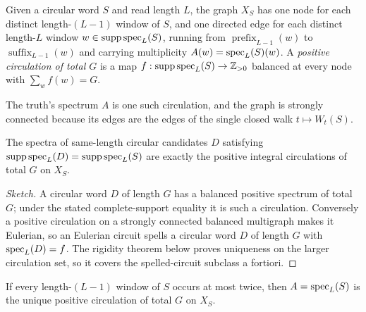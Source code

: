 \begin{definition}
\label{def:graph}
Given a circular word $S$ and read length $L$, the graph $X_S$ has one node for
each distinct length-$(L-1)$ window of $S$, and one directed edge for each
distinct length-$L$ window $w\in\operatorname{supp}\operatorname{spec}_L(S)$, running from
$\operatorname{prefix}_{L-1}(w)$ to $\operatorname{suffix}_{L-1}(w)$ and carrying
multiplicity $A(w)=\operatorname{spec}_L(S)(w)$. A \emph{positive circulation of total $G$} is
a map $f:\operatorname{supp}\operatorname{spec}_L(S)\to\mathbb{Z}_{>0}$ balanced at every node with
$\sum_w f(w)=G$.
\end{definition}

The truth's spectrum $A$ is one such circulation, and the graph is strongly
connected because its edges are the edges of the single closed walk
$t\mapsto W_t(S)$.

\begin{lemma}
\label{lem:reduction}
The spectra of same-length circular candidates $D$ satisfying
$\operatorname{supp}\operatorname{spec}_L(D)=\operatorname{supp}\operatorname{spec}_L(S)$ are exactly
the positive integral circulations of total $G$ on $X_S$.
\end{lemma}

\begin{proof}[Sketch]
A circular word $D$ of length $G$ has a balanced positive spectrum of total $G$;
under the stated complete-support equality it is such a circulation. Conversely a positive
circulation on a strongly connected balanced multigraph makes it Eulerian, so an
Eulerian circuit spells a circular word $D$ of length $G$ with
$\operatorname{spec}_L(D)=f$. The rigidity theorem below proves uniqueness on the larger
circulation set, so it covers the spelled-circuit subclass a fortiori.
\end{proof}

\begin{theorem}
\label{thm:short-repeat}
If every length-$(L-1)$ window of $S$ occurs at most twice, then
$A=\operatorname{spec}_L(S)$ is the unique positive circulation of total $G$ on $X_S$.
\end{theorem}

